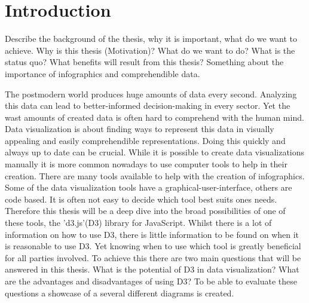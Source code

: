 \chapter{Introduction}
Describe the background of the thesis, why it is important, what do we want to achieve.
Why is this thesis (Motivation)? What do we want to do? What is the status quo? What benefits will result from this thesis?
Something about the importance of infographics and comprehendible data. 


The postmodern world produces huge amounts of data every second. Analyzing this data can lead to better-informed decision-making in every sector. Yet the wast amounts of created data is often hard to comprehend with the human mind. Data visualization is about finding ways to represent this data in visually appealing and easily comprehendible representations. Doing this quickly and always up to date can be crucial. While it is possible to create data visualizations manually it is more common nowadays to use computer tools to help in their creation. There are many tools available to help with the creation of infographics. Some of the data visualization tools have a graphical-user-interface, others are code based. It is often not easy to decide which tool best suits ones needs. Therefore this thesis will be a deep dive into the broad possibilities of one of these tools, the 'd3.js'(D3) library for JavaScript. Whilst there is a lot of information on how to use D3, there is little information to be found on when it is reasonable to use D3. Yet knowing when to use which tool is greatly beneficial for all parties involved. To achieve this there are two main questions that will be answered in this thesis. What is the potential of D3 in data visualization? What are the advantages and disadvantages of using D3? To be able to evaluate these questions a showcase of a several different diagrams is created.
